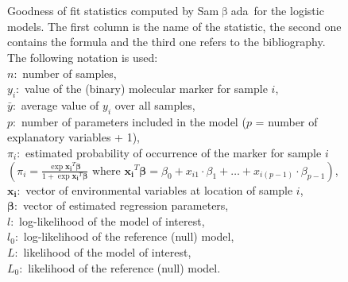 \documentclass[a4paper,11pt]{article}
\newcommand{\smb}{\textsf{Sam$\upbeta$ada}}
\begin{document}
\begin{figure}[htbp]
\scriptsize
{}\\
\\
\caption[Goodness of fit statistics computed by \smb\ for the logistic models.]
{Goodness of fit statistics computed by \smb\ for the logistic models. 
The first column is the name of the statistic, the second one contains the formula and the third one refers to the bibliography. 
The following notation is used: \\
$n$:~number of samples, \\
$y_i$:~value of the (binary) molecular marker for sample $i$, \\
$\bar{y}$:~average value of $y_i$ over all samples, \\
$p$:~number of parameters included in the model ($p$ = number of explanatory variables + 1), \\
$\pi_i$:~estimated probability of occurrence of the marker for sample $i$ \( \left( \pi_i = \frac{ \exp{\bm{x_i}^T \bm{\beta} }}{1 + \exp{\bm{x_i}^T \bm{\beta} }} \mbox{ where } \bm{x_i}^T \bm{\beta} = \beta_0 + x_{i1} \cdot \beta_1 + \dots + x_{i(p-1)} \cdot \beta_{p-1} \right) \), \\
$\bm{x_i}$:~vector of environmental variables at location of sample $i$, \\
$\bm{\beta}$:~vector of estimated regression parameters, \\
$l$:~log-likelihood of the model of interest, \\
$l_0$:~log-likelihood of the reference (null) model, \\
$L$:~likelihood of the model of interest, \\
$L_0$:~likelihood of the reference (null) model.
}
\label{fig:goodness-of-fit-statistics}
\end{figure}
\end{document}
